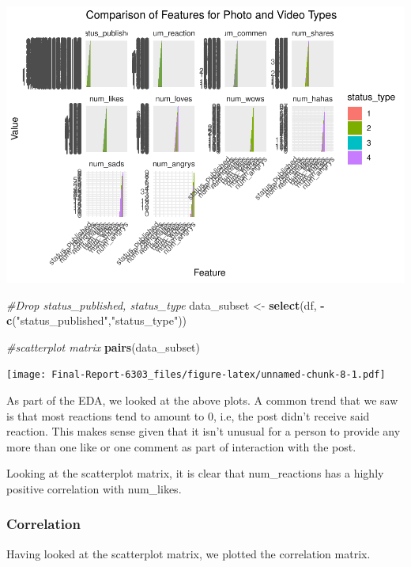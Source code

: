 \documentclass[
]{article}
\newenvironment{Shaded}{\begin{snugshade}}{\end{snugshade}}
\newcommand{\CommentTok}[1]{\textcolor[rgb]{0.56,0.35,0.01}{\textit{#1}}}
\newcommand{\FunctionTok}[1]{\textcolor[rgb]{0.13,0.29,0.53}{\textbf{#1}}}
\newcommand{\NormalTok}[1]{#1}
\newcommand{\OtherTok}[1]{\textcolor[rgb]{0.56,0.35,0.01}{#1}}
\newcommand{\SpecialCharTok}[1]{\textcolor[rgb]{0.81,0.36,0.00}{\textbf{#1}}}
\newcommand{\StringTok}[1]{\textcolor[rgb]{0.31,0.60,0.02}{#1}}
\begin{document}
\includegraphics{Final-Report-6303_files/figure-latex/unnamed-chunk-7-1.pdf}

\begin{Shaded}
\begin{Highlighting}[]
\CommentTok{\#Drop status\_published, status\_type}
\NormalTok{data\_subset }\OtherTok{\textless{}{-}} \FunctionTok{select}\NormalTok{(df, }\SpecialCharTok{{-}}\FunctionTok{c}\NormalTok{(}\StringTok{"status\_published"}\NormalTok{,}\StringTok{"status\_type"}\NormalTok{))}

\CommentTok{\#scatterplot matrix}
\FunctionTok{pairs}\NormalTok{(data\_subset)}
\end{Highlighting}
\end{Shaded}

\texttt{[image: Final-Report-6303\_files/figure-latex/unnamed-chunk-8-1.pdf]}

As part of the EDA, we looked at the above plots. A common trend that we
saw is that most reactions tend to amount to 0, i.e, the post didn't
receive said reaction. This makes sense given that it isn't unusual for
a person to provide any more than one like or one comment as part of
interaction with the post.

Looking at the scatterplot matrix, it is clear that num\_reactions has a
highly positive correlation with num\_likes.

\subsubsection{Correlation}\label{correlation}

Having looked at the scatterplot matrix, we plotted the correlation
matrix.
\end{document}
